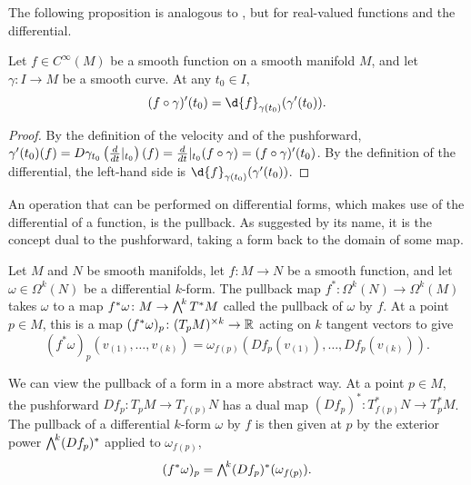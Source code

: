 \documentclass[a4paper,12pt]{article}
\begin{document}
The following proposition is analogous to , but for real-valued functions and the differential.
\begin{proposition}\label{prop:differential_of_velocity}
    Let $f \in C^\infty(M)$ be a smooth function on a smooth manifold $M$, and let $\gamma \colon I \to M$ be a smooth curve.
    At any $t_0 \in I$,
    \begin{equation}
        (f \circ \gamma)'(t_0) = \d{f}_{\gamma(t_0)}(\gamma'(t_0)).
    \end{equation}
\end{proposition}
\begin{proof}
    By the definition of the velocity and of the pushforward, $\gamma'(t_0)(f) = D\gamma_{t_0}\left(\eval*{\frac{d}{dt}}{t_0}\right)(f) = \eval*{\frac{d}{dt}}{t_0}(f \circ \gamma) = (f \circ \gamma)'(t_0)$.
    By the definition of the differential, the left-hand side is $\d{f}_{\gamma(t_0)}(\gamma'(t_0))$. \qedhere
\end{proof}
An operation that can be performed on differential forms, which makes use of the differential of a function, is the pullback.
As suggested by its name, it is the concept dual to the pushforward, taking a form back to the domain of some map.
\begin{definition}\label{def:pullback_of_differential_forms}
    Let $M$ and $N$ be smooth manifolds, let $f \colon M \to N$ be a smooth function, and let $\omega \in \Omega^k(N)$ be a differential $k$-form.
    The pullback map $f^* \colon \Omega^k(N) \to \Omega^k(M)$ takes $\omega$ to a map $f^*\omega \colon M \to \extp^k T^* M$ called the pullback of $\omega$ by $f$.
    At a point $p \in M$, this is a map $(f^* \omega)_p \colon (T_p M)^{\times k} \to \mathbb{R}$ acting on $k$ tangent vectors to give
    \begin{equation}
        (f^*\omega)_p(v_{(1)}, \ldots, v_{(k)}) = \omega_{f(p)}(Df_p(v_{(1)}), \ldots, Df_p(v_{(k)})).
    \end{equation}
\end{definition}
We can view the pullback of a form in a more abstract way.
At a point $p \in M$, the pushforward $Df_p \colon T_p M \to T_{f(p)} N$ has a dual map $(Df_p)^* \colon T^*_{f(p)} N \to T^*_p M$.
The pullback of a differential $k$-form $\omega$ by $f$ is then given at $p$ by the exterior power $\extp^k (Df_p)^*$ applied to $\omega_{f(p)}$,
\begin{equation}
    (f^*\omega)_p = \extp^k (Df_p)^* (\omega_{f(p)}).
\end{equation}
\end{document}

